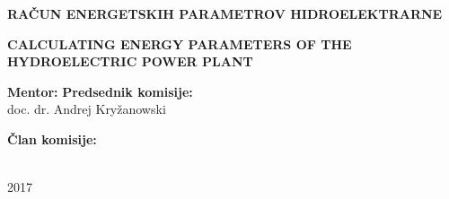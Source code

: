 \begin{minipage}{\textwidth}
\begin{center}
\vspace*{1cm}

\begin{Large}
\textbf{RAČUN ENERGETSKIH PARAMETROV HIDROELEKTRARNE}
\end{Large}


\vspace*{2cm}

\begin{Large}
	\textbf{CALCULATING ENERGY PARAMETERS OF THE HYDROELECTRIC POWER PLANT}
\end{Large}



\end{center}
\vspace*{4cm}




\begin{large}
	\textbf{Mentor:}    \hfill  \textbf{Predsednik komisije:}\\
	doc. dr. Andrej Kryžanowski \\
\end{large}



\begin{large}
	\textbf{Član komisije:}\\
	\\
\end{large}
\vspace{4cm}

\begin{center}
\textsc{2017}
\end{center}

\end{minipage}

\newpage
\thispagestyle{empty}
\cleardoublepage